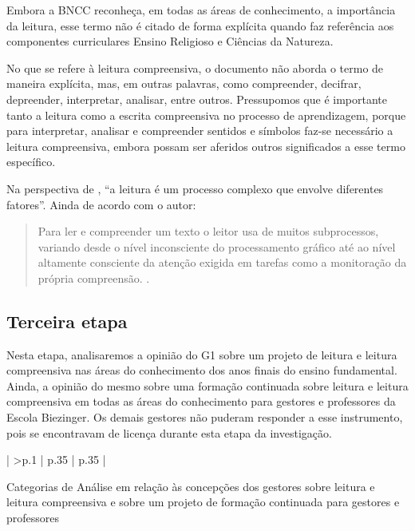\begin{refsection}
    Embora a BNCC reconheça, em todas as áreas de conhecimento, a importância da leitura, esse termo não é citado de forma explícita quando faz referência aos componentes curriculares Ensino Religioso e Ciências da Natureza.  

    No que se refere à leitura compreensiva, o documento não aborda o termo de maneira explícita, mas, em outras palavras, como compreender, decifrar, depreender, interpretar, analisar, entre outros. Pressupomos que é importante tanto a leitura como a escrita compreensiva no processo de aprendizagem, porque para interpretar, analisar e compreender sentidos e símbolos faz-se necessário a leitura compreensiva, embora possam ser aferidos outros significados a esse termo específico.  

    Na perspectiva de \textcite[p.~26]{Leffa1996Fatores}, “a leitura é um processo complexo que envolve diferentes fatores”. Ainda de acordo com o autor:

    \begin{quotation}
        Para ler e compreender um texto o leitor usa de muitos subprocessos, variando desde o nível inconsciente do processamento gráfico até ao nível altamente consciente da atenção exigida em tarefas como a monitoração da própria compreensão. \cite[p.~26]{Leffa1996Fatores}. 
    \end{quotation}

    \subsection{Terceira etapa}

    Nesta etapa, analisaremos a opinião do G1 sobre um projeto de leitura e leitura compreensiva nas áreas do conhecimento dos anos finais do ensino fundamental. Ainda, a opinião do mesmo sobre uma formação continuada sobre leitura e leitura compreensiva em todas as áreas do conhecimento para gestores e professores da Escola Biezinger. Os demais gestores não puderam responder a esse instrumento, pois se encontravam de licença durante esta etapa da investigação.

    \begin{small}
        \begin{longquadro}[t]{ | 
            >{\centering\arraybackslash}p{.1\textwidth} |
            p{.35\textwidth} |
            p{.35\textwidth} |
        }
            \caption{Categorias de Análise em relação às concepções dos gestores sobre leitura e leitura compreensiva e sobre um projeto de formação continuada para gestores e professores}
            \label{quad:cat-analise-concep}\\
    

\end{longquadro}
\end{small}
\end{refsection}
